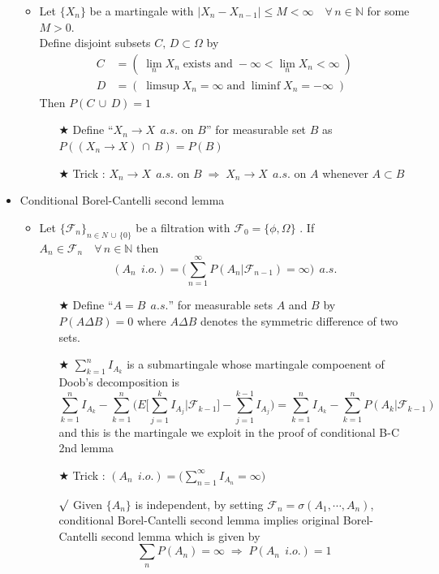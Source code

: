 \documentclass[12pt, A4]{article}
\newcommand{\rmk}{$\surd$}
\newcommand{\trick}{$\bigstar$}
\newcommand{\N}{\mathbb{N}}
\newcommand{\F}{\mathcal{F}}
\newcommand{\union}{\,\cup\,}
\newcommand{\intersect}{\,\cap\,}
\newcommand{\foranyn}{\quad \forall \, n\in \N}
\begin{document}
\begin{itemize}
	\begin{itemize}
		\item Let $\{X_n\}$ be a martingale with $|X_n-X_{n-1}|\leq M<\infty\foranyn$ for some $M>0$. \\Define disjoint subsets $C,\,D\subset \Omega$ by 
		\begin{align*}
			C&=(\;\lim_n X_n\; \text{exists and}\; -\infty<\lim_nX_n<\infty \;)\\
			D&=(\;\limsup X_n=\infty \;\text{and}\; \liminf X_n=-\infty \;)
		\end{align*}
		Then $P(C\union D)=1$
		\begin{itemize}
			\item[\trick] Define ``$X_n\rightarrow X\;\,a.s.$ on $B$'' for measurable set $B$ as $P((X_n\rightarrow X)\intersect B)=P(B)$ 
			\item[\trick] Trick : $X_n\rightarrow X\;\,a.s.$ on $B\;\Rightarrow\; X_n\rightarrow X\;\,a.s.$ on $A$ whenever $A\subset B$ 
		\end{itemize}
	\end{itemize}
	\item Conditional Borel-Cantelli second lemma
	\begin{itemize}
		\item Let $\{\F_n\}_{n\in N\union \{0\}}$ be a filtration with $\F_0=\{\phi, \Omega\}$ . If $A_n\in \F_n\foranyn$ then $$(A_n\;\,i.o.)=\Big(\sum_{n=1}^\infty P(A_n|\F_{n-1})=\infty\Big)\;\,a.s. $$
		\begin{itemize}
			\item[\trick] Define ``$A=B\;\,a.s.$'' for measurable sets $A$ and $B$ by $P(A\Delta B)=0$ where $A\Delta B$ denotes the symmetric difference of two sets.
			\item[\trick] $\sum_{k=1}^n I_{A_k}$ is a submartingale whose martingale compoenent of Doob's decomposition is $$\sum_{k=1}^n I_{A_k}-\sum_{k=1}^n\Big( E\Big[\sum_{j=1}^k I_{A_j}|\F_{k-1}\Big]-\sum_{j=1}^{k-1}I_{A_{j}}\Big)=\sum_{k=1}^n I_{A_k}-\sum_{k=1}^nP(A_k|\F_{k-1})$$ and this is the martingale we exploit in the proof of conditional B-C 2nd lemma 
			\item[\trick] Trick : $(A_n\;\,i.o.)=\big(\sum_{n=1}^\infty I_{A_n}=\infty \big)$
			\item[\rmk] Given $\{A_n\}$ is independent, by setting $\F_n=\sigma(A_1, \cdots, A_n)$, conditional Borel-Cantelli second lemma implies original Borel-Cantelli second lemma which is given by $$\sum_n P(A_n)=\infty \;\Rightarrow \;P(A_n\;\, i.o.)=1 $$   
		\end{itemize}

\end{itemize}
\end{itemize}
\end{document}
